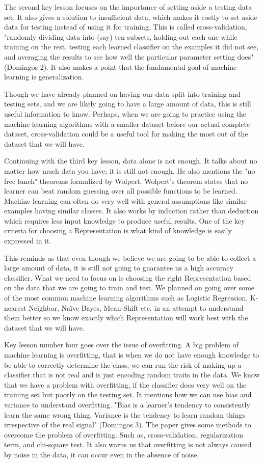 \documentclass[a4paper,12pt]{report}
\begin{document}
The second key lesson focuses on the importance of setting aside a testing data set. It also gives a solution to insufficient data, which makes it costly to set aside data for testing instead of using it for training. This is called cross-validation, "randomly dividing data into (say) ten subsets, holding out each one while training on the rest, testing each learned classifier on the examples it did not see, and averaging the results to see how well the particular parameter setting does" (Domingos 2). It also makes a point that the fundamental goal of machine learning is generalization.

Though we have already planned on having our data split into training and testing sets, and we are likely going to have a large amount of data, this is still useful information to know. Perhaps, when we are going to practice using the machine learning algorithms with a smaller dataset before our actual complete dataset, cross-validation could be a useful tool for making the most out of the dataset that we will have.

Continuing with the third key lesson, data alone is not enough. It talks about no matter how much data you have; it is still not enough. He also mentions the "no free lunch" theorems formalized by Wolpert. Wolpert’s theorem states that no learner can beat random guessing over all possible functions to be learned. Machine learning can often do very well with general assumptions like similar examples having similar classes. It also works by induction rather than deduction which requires less input knowledge to produce useful results. One of the key criteria for choosing a Representation is what kind of knowledge is easily expressed in it.

This reminds us that even though we believe we are going to be able to collect a large amount of data, it is still not going to guarantee us a high accuracy classifier. What we need to focus on is choosing the right Representation based on the data that we are going to train and test. We planned on going over some of the most common machine learning algorithms such as Logistic Regression, K-nearest Neighbor, Naïve Bayes, Mean-Shift etc. in an attempt to understand them better so we know exactly which Representation will work best with the dataset that we will have.

Key lesson number four goes over the issue of overfitting. A big problem of machine learning is overfitting, that is when we do not have enough knowledge to be able to correctly determine the class, we can run the risk of making up a classifier that is not real and is just encoding random traits in the data. We know that we have a problem with overfitting, if the classifier does very well on the training set but poorly on the testing set. It mentions how we can use bias and variance to understand overfitting. "Bias is a learner’s tendency to consistently learn the same wrong thing. Variance is the tendency to learn random things irrespective of the real signal" (Domingos 3). The paper gives some methods to overcome the problem of overfitting. Such as, cross-validation, regularization term, and chi-square test. It also warns us that overfitting is not always caused by noise in the data, it can occur even in the absence of noise.
\end{document}
